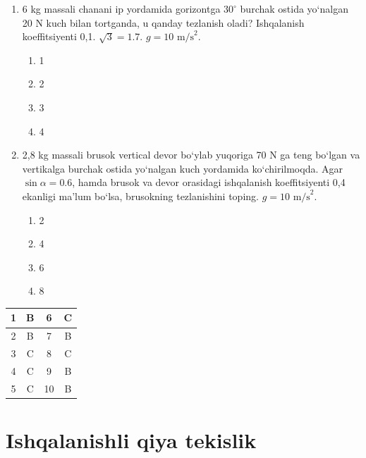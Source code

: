\begin{enumerate}
\item 6 kg massali chanani ip yordamida gorizontga
$30^\circ$ burchak ostida yo‘nalgan 20 N kuch bilan
tortganda, u qanday tezlanish oladi?
Ishqalanish koeffitsiyenti 0,1.
$\sqrt3=1.7$.
$g=10\text{ m/s}^2$.

\begin{enumerate}[label=\Alph*)]
\item 1
\item 2
\item 3
\item 4
\end{enumerate}

\item 2,8 kg massali brusok vertical devor bo‘ylab
yuqoriga 70 N ga teng bo‘lgan va vertikalga burchak
ostida yo‘nalgan kuch yordamida ko‘chirilmoqda.
Agar $\sin\alpha=0.6$, hamda brusok va devor orasidagi
ishqalanish koeffitsiyenti 0,4 ekanligi ma’lum bo‘lsa,
brusokning tezlanishini toping.
$g=10\text{ m/s}^2$.

\begin{enumerate}[label=\Alph*)]
\item 2
\item 4
\item 6
\item 8
\end{enumerate}

\end{enumerate}



\begin{center}
\begin{tabular}{|c|c||c|c|}
\hline
1 & B & 6 & C \\
\hline
2 & B & 7 & B \\
\hline
3 & C & 8 & C \\
\hline
4 & C & 9 & B \\
\hline
5 & C & 10 & B \\
\hline
\end{tabular}
\end{center}











\section{Ishqalanishli qiya tekislik}

